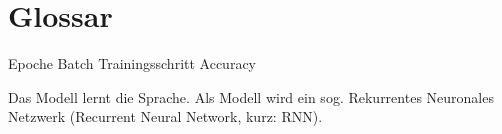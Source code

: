 \chapter*{Glossar}
\renewcommand{\glossarysection}[2][]{}

\printglossaries

Epoche
Batch
Trainingsschritt
Accuracy

Das Modell lernt die Sprache.
Als Modell wird ein sog. Rekurrentes Neuronales Netzwerk (Recurrent Neural Network, kurz: RNN).


